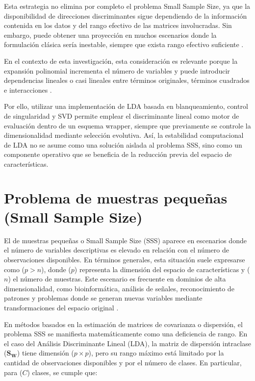 Esta estrategia no elimina por completo el problema Small Sample Size, ya que la disponibilidad de direcciones discriminantes sigue dependiendo de la información contenida en los datos y del rango efectivo de las matrices involucradas. Sin embargo, puede obtener una proyección en muchos escenarios donde la formulación clásica sería inestable, siempre que exista rango efectivo suficiente \cite{krzanowski1995discriminant}.

En el contexto de esta investigación, esta consideración es relevante porque la expansión polinomial incrementa el número de variables y puede introducir dependencias lineales o casi lineales entre términos originales, términos cuadrados e interacciones \cite{montgomery2022introduction}. 

Por ello, utilizar una implementación de LDA basada en blanqueamiento, control de singularidad y SVD permite emplear el discriminante lineal como motor de evaluación dentro de un esquema wrapper, siempre que previamente se controle la dimensionalidad mediante selección evolutiva. Así, la estabilidad computacional de LDA no se asume como una solución aislada al problema SSS, sino como un componente operativo que se beneficia de la reducción previa del espacio de características.

\section{Problema de muestras pequeñas (Small Sample Size)}

El de muestras pequeñas o Small Sample Size (SSS) aparece en escenarios donde el número de variables descriptivas es elevado en relación con el número de observaciones disponibles. En términos generales, esta situación suele expresarse como ($p>n$), donde ($p$) representa la dimensión del espacio de características y ($n$) el número de muestras. Este escenario es frecuente en dominios de alta dimensionalidad, como bioinformática, análisis de señales, reconocimiento de patrones y problemas donde se generan nuevas variables mediante transformaciones del espacio original \cite{raudys1991small}\cite{sorzano2014survey}.

En métodos basados en la estimación de matrices de covarianza o dispersión, el problema SSS se manifiesta matemáticamente como una deficiencia de rango. En el caso del Análisis Discriminante Lineal (LDA), la matriz de dispersión intraclase ($\mathbf{S_W}$) tiene dimensión ($p\times p$), pero su rango máximo está limitado por la cantidad de observaciones disponibles y por el número de clases. En particular, para ($C$) clases, se cumple que:

